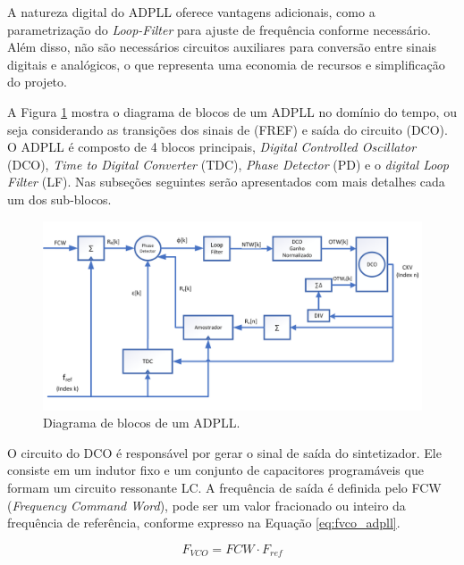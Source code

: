 A natureza digital do ADPLL oferece vantagens adicionais, como a parametrização do \textit{Loop-Filter} para ajuste de frequência conforme necessário. Além disso, não são necessários circuitos auxiliares para conversão entre sinais digitais e analógicos, o que representa uma economia de recursos e simplificação do projeto.

A Figura \ref{fig:adpll_block_diagram} mostra o diagrama de blocos de um ADPLL no domínio do tempo, ou seja considerando as transições dos sinais de (FREF) e saída do circuito (DCO). O ADPLL é composto de 4 blocos principais,  \textit{Digital Controlled Oscillator} (DCO), \textit{Time to Digital Converter} (TDC), \textit{Phase Detector} (PD) e o \textit{ digital Loop Filter} (LF). Nas subseções seguintes serão apresentados com mais detalhes cada um dos sub-blocos. 

\begin{figure}[h!]
	\caption{Diagrama de blocos de um ADPLL.}
	\begin{center}
		\includegraphics[scale=1]{img/blocos_ADPLL.png}
	\end{center}
	\label{fig:adpll_block_diagram}
\end{figure}

O circuito do DCO é responsável por gerar o sinal de saída do sintetizador. Ele consiste em um indutor fixo e um conjunto de capacitores programáveis que formam um circuito ressonante LC. A frequência de saída é definida pelo FCW (\textit{Frequency Command Word}), pode ser um valor fracionado ou inteiro da frequência de referência, conforme expresso na Equação \ref{eq:fvco_adpll}.

\begin{equation}
	F_{VCO} = FCW \cdot F_{ref}
	\label{eq:fvco_adpll}
\end{equation}

